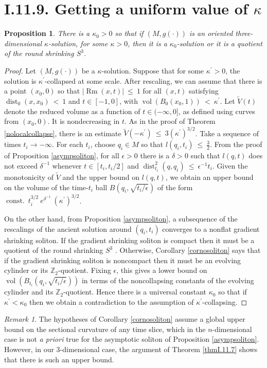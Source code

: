 \documentclass[12pt]{amsart}
\newcommand{\const}{\operatorname{const.}}
\newcommand{\dist}{\operatorname{dist}}
\newcommand{\Rm}{\operatorname{Rm}}
\newcommand{\vol}{\operatorname{vol}}
\newcommand{\Z}{{\mathbb Z}}
\numberwithin{equation}{section}
\theoremstyle{plain}
\newtheorem{proposition}[equation]{Proposition}
\theoremstyle{definition}
\theoremstyle{remark}
\newtheorem{remark}[equation]{Remark}
\begin{document}
\section{I.11.9. Getting a uniform value of $\kappa$}
\label{secI.11.9}


\begin{proposition} \label{propI.11.9}
There is a $\kappa_0 > 0$ so that if $(M, g(\cdot))$ is an oriented
three-dimensional $\kappa$-solution, for some
$\kappa > 0$, then it is a $\kappa_0$-solution or
it is a quotient of the round shrinking $S^3$.
\end{proposition}
\begin{proof}
Let $(M, g(\cdot))$ be a $\kappa$-solution.
Suppose that for some $\kappa^\prime>0$, 
the solution is $\kappa^\prime$-collapsed at some scale.  
After
rescaling, we can assume that there is a point $(x_0, 0)$ so that
$|\Rm(x, t)| \: \le \: 1$ for all $(x, t)$ satisfying
$\dist_0(x, x_0) \: < \: 1$ and $t \in [-1, 0]$, with
$\vol(B_0(x_0, 1)) \: < \: \kappa^\prime$.  Let $\widetilde{V}(t)$ denote
the reduced volume as a function of $t \in (- \infty, 0]$, as
defined using curves from $(x_0, 0)$. It is nondecreasing in $t$.
As in the proof of Theorem \ref{nolocalcollapse}, there is an estimate
$\widetilde{V}(-\kappa^\prime) \: \le \: 3 (\kappa^\prime)^{3/2}$. Take a sequence
of times $t_i \rightarrow - \infty$. For each $t_i$, choose $q_i \in M$
so that $l(q_i, t_i) \: \le \: \frac{3}{2}$. From the proof of Proposition
\ref{asympsoliton}, for all $\epsilon > 0$
there is a $\delta > 0$ such that $l(q, t)$
does not exceed $\delta^{-1}$ whenever $t \in [t_i, t_i/2]$ and
$\dist_{t_i}^2(q, q_i) \: \le \: \epsilon^{-1} t_i$. Given the
monotonicity of $\widetilde{V}$ and the upper bound on $l(q,t)$,
we obtain an upper bound on the volume of the time-$t_i$ ball
$B(q_i, \sqrt{t_i/\epsilon})$ of the form $\const \: t_i^{3/2} \:
e^{\delta^{-1}} \: (\kappa^\prime)^{3/2}$. 

On the other hand, from
Proposition \ref{asympsoliton}, a subsequence of the rescalings
of the ancient solution around $(q_i, t_i)$ converges to a nonflat
gradient shrinking soliton.  If the gradient shrinking soliton is compact
then it must be a quotient of the round shrinking $S^3$
\cite{Hamiltonnnnn}. Otherwise,
Corollary \ref{cornosoliton} says that if the gradient shrinking soliton is
noncompact then it must be an evolving cylinder or its
$\Z_2$-quotient.  Fixing $\epsilon$, this gives a lower bound on
$\vol(B_{t_i} (q_i, \sqrt{t_i/\epsilon}))$ in terms of the noncollapsing
constants of the evolving cylinder and its $\Z_2$-quotient. Hence there
is a universal constant $\kappa_0$ so that if
$\kappa^\prime<\kappa_0$ then we obtain a contradiction to the
assumption of $\kappa^\prime$-collapsing.
\end{proof}
\begin{remark} The hypotheses of Corollary \ref{cornosoliton} 
assume a global upper bound on the sectional curvature of any time slice, 
which in the $n$-dimensional case
is not {\it a priori} true for the asymptotic soliton of
Proposition \ref{asympsoliton}.  However, in our $3$-dimensional case, 
the argument of Theorem \ref{thmI.11.7} shows that there is such an upper bound.
\end{remark}
\end{document}
